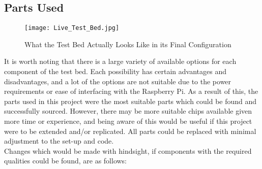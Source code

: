 \documentclass[../main.tex]{subfiles}
\begin{document}
\subsection{Parts Used}

\begin{figure}[ht]
	\centering
	\texttt{[image: Live\_Test\_Bed.jpg]}
	\caption{What the Test Bed Actually Looks Like in its Final Configuration}
\end{figure}


It is worth noting that there is a large variety of available options for each component of the test bed.
Each possibility has certain advantages and disadvantages, and a lot of the options are not suitable due to the power requirements or ease of interfacing with the Raspberry Pi.
As a result of this, the parts used in this project were the most suitable parts which could be found and successfully sourced.
However, there may be more suitable chips available given more time or experience, and being aware of this would be useful if this project were to be extended and/or replicated.
All parts could be replaced with minimal adjustment to the set-up and code.\\

Changes which would be made with hindsight, if components with the required qualities could be found, are as follows:
\end{document}
